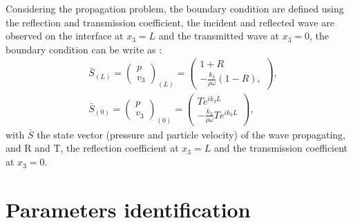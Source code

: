 \documentclass{article}
\begin{document}
    Considering the propagation problem, the boundary condition are defined using the reflection and transmission coefficient, the incident and reflected wave are observed on the interface at $x_3=L$ and the transmitted wave at $x_3=0$, the boundary condition can be write as :
     \begin{align}
    &\bar{S}_{(L)}=\begin{pmatrix}
    	p \\ v_3
    \end{pmatrix}_{(L)}=\begin{pmatrix}
    					    1+R \\ -\frac{k_3}{\rho \omega}(1-R),
    					\end{pmatrix},\label{BC_L} \\
  	&\bar{S}_{(0)}=\begin{pmatrix}
    	p \\ v_3
    \end{pmatrix}_{(0)}=\begin{pmatrix}
    						Te^{ik_3L} \\ -\frac{k_3}{\rho \omega}Te^{ik_3L}
    					\end{pmatrix},\label{BC_0}
    \end{align}                         
    with $\bar{S}$ the state vector (pressure and particle velocity) of the wave propagating, and R and T, the reflection coefficient at $x_3=L$ and the transmission coefficient at $x_3=0$.  
    
\section{Parameters identification}
\end{document}
